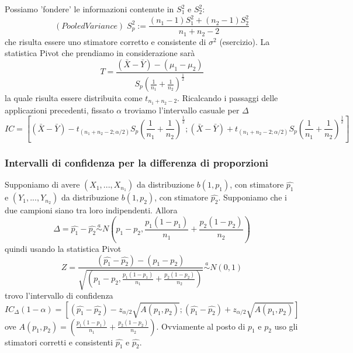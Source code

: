 Possiamo 'fondere' le informazioni contenute in $S^2_1$ e $S^2_2$: $$(Pooled Variance) \; S^2_p:= \frac{(n_1 - 1)S^2_1 + (n_2 - 1)S^2_2}{n_1 + n_2 - 2} $$ 
che risulta essere uno stimatore corretto e consistente di $\sigma^2$ (esercizio).
La statistica Pivot che prendiamo in considerazione sarà $$T=\frac{(\bar{X} - \bar{Y})-(\mu_1 - \mu_2)}{S_p \left(\frac{1}{n_1} + \frac{1}{n_2} \right)^{\frac{1}{2}}}$$ la quale risulta essere distribuita come $t_{n_1 + n_2 - 2}$. Ricalcando i passaggi delle applicazioni precedenti, fissato $\alpha$  troviamo l'intervallo casuale per $\Delta$ $$IC = \left[(\bar{X} - \bar{Y}) - t_{(n_1 + n_2 - 2;\alpha / 2)} S_p \left(\frac{1}{n_1} + \frac{1}{n_2} \right)^{\frac{1}{2}} ; (\bar{X} - \bar{Y}) + t_{(n_1 + n_2 - 2;\alpha / 2)} S_p \left(\frac{1}{n_1} + \frac{1}{n_2} \right)^{\frac{1}{2}} \right]$$

\subsubsection{Intervalli di confidenza per la differenza di proporzioni}

Supponiamo di avere $(X_1,...,X_{n_1})$ da distribuzione $b(1,p_1)$, con stimatore $\hat{p_1}$ e $(Y_1,...,Y_{n_2})$ da distribuzione $b(1,p_2)$, con stimatore $\hat{p_2}$. Supponiamo che i due campioni siano tra loro indipendenti. Allora $$\Delta=\hat{p_1} - \hat{p_2} \stackrel {a} {\sim} N\left( p_1 - p_2, \frac{p_1(1-p_1)}{n_1} + \frac{p_2(1-p_2)}{n_2}\right)$$ quindi usando la statistica Pivot 
$$Z=\frac{(\hat{p_1} - \hat{p_2}) - (p_1 - p_2)}{\sqrt{\left( p_1 - p_2, \frac{p_1(1-p_1)}{n_1} + \frac{p_2(1-p_2)}{n_2}\right)}} \stackrel {a} {\sim} N(0,1)$$ trovo l'intervallo di confidenza $$IC_\Delta (1-\alpha) = \left[ 
(\hat{p_1} - \hat{p_2}) - z_{\alpha / 2} \sqrt{A(p_1,p_2)};(\hat{p_1} - \hat{p_2}) + z_{\alpha / 2} \sqrt{A(p_1,p_2)}
 \right]$$ ove $A(p_1,p_2)=\left(\frac{p_1(1-p_1)}{n_1} + \frac{p_2(1-p_2)}{n_2}\right)$. Ovviamente al posto di $p_1$ e $p_2$ uso gli stimatori corretti e consistenti $\hat{p_1}$ e $\hat{p_2}$.